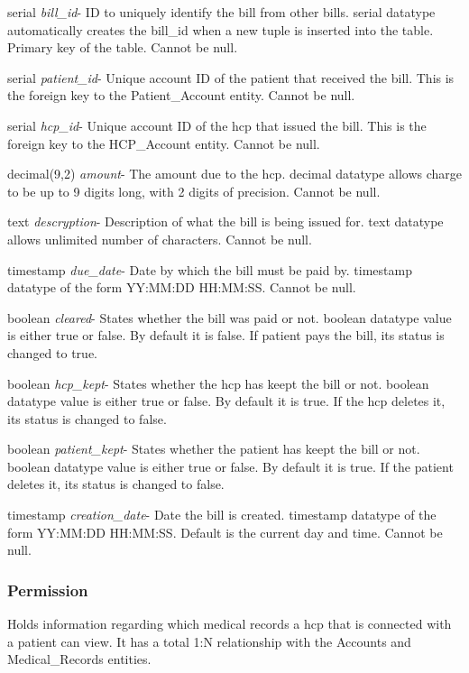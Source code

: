 \begin{description}
\item serial \textit{bill\_id}-  ID to uniquely identify the bill from other bills. serial datatype automatically creates the bill\_id when a new tuple is inserted into the table.  Primary key of the table.  Cannot be null.
\item serial \textit{patient\_id}- Unique account ID of the patient that received the bill.  This is the foreign key to the Patient\_Account entity.  Cannot be null.
\item serial \textit{hcp\_id}- Unique account ID of the hcp that issued the bill.  This is the foreign key to the HCP\_Account entity.  Cannot be null.
\item decimal(9,2) \textit{amount}- The amount due to the hcp.  decimal datatype allows charge to be up to 9 digits long, with 2 digits of precision.  Cannot be null.
\item text \textit{descryption}- Description of what the bill is being issued for.  text datatype allows unlimited number of characters. Cannot be null.
\item timestamp \textit{due\_date}- Date by which the bill must be paid by.  timestamp datatype of the form YY:MM:DD HH:MM:SS.  Cannot be null.
\item boolean \textit{cleared}- States whether the bill was paid or not.  boolean datatype value is either true or false.  By default it is false.  If patient pays the bill, its status is changed to true.
\item boolean \textit{hcp\_kept}- States whether the hcp has keept the bill or not.  boolean datatype value is either true or false.  By default it is true.  If the hcp deletes it, its status is changed to false.
\item boolean \textit{patient\_kept}- States whether the patient has keept the bill or not.  boolean datatype value is either true or false.  By default it is true.  If the patient deletes it, its status is changed to false.
\item timestamp \textit{creation\_date}- Date the bill is created.  timestamp datatype of the form YY:MM:DD HH:MM:SS.  Default is the current day and time.  Cannot be null.
\end{description}

\subsubsection{Permission}
Holds information regarding which medical records a hcp that is connected with a patient can view.  It has a total 1:N relationship with the Accounts and Medical\_Records entities.

